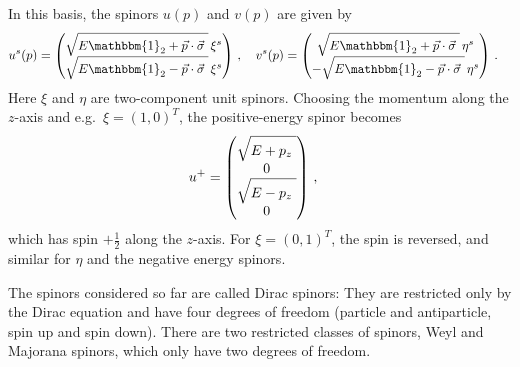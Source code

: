 \documentclass[12pt]{report}
\newcommand{\2}{\ensuremath{\sqrt{2}\,}}
\begin{document}
{      In this basis, the spinors $u\!\left(p\right)$ and $v\!\left(p\right)$ are given by 
      \begin{align}
        u^s\!\left(p\right) &= \begin{pmatrix}\sqrt{E \mathbbm{1}_2
            +\vec{p}\cdot\vec{\sigma}\rule[10pt]{3pt}{0pt}}\, \xi^s\\ 
          \sqrt{E \mathbbm{1}_2 -\vec{p}\cdot\vec{\sigma}\rule[10pt]{3pt}{0pt}}\,\xi^s \end{pmatrix}
        \,,\quad v^s\!\left(p\right) 
        = \begin{pmatrix}\sqrt{E \mathbbm{1}_2 +\vec{p}\cdot\vec{\sigma}\rule[10pt]{3pt}{0pt}} \,\eta^s\\  -\sqrt{E
            \mathbbm{1}_2 -\vec{p}\cdot\vec{\sigma}\rule[10pt]{3pt}{0pt}}\,\eta^s \end{pmatrix}  \,.
      \end{align}
      Here $\xi$ and $\eta$ are two-component unit spinors. Choosing the momentum along the $z$-axis
      and e.g.\ $\xi=\left(1,0\right)^T$, the positive-energy spinor becomes
      \begin{align}
        u^+ &= \begin{pmatrix} \sqrt{E+p_z\rule[10pt]{3pt}{0pt}}\\0 \\
          \sqrt{E-p_z\rule[10pt]{3pt}{0pt}}\\0\end{pmatrix}\,, 
      \end{align}
      which has spin $+\frac{1}{2}$ along the $z$-axis. For $\xi=\left(0,1\right)^T$, the spin is
      reversed, and similar for $\eta$ and the negative energy spinors.

      The spinors considered so far are called Dirac spinors: They are restricted only by the Dirac
      equation and have four degrees of freedom (particle and antiparticle, spin up and spin
      down). There are two restricted classes of spinors, Weyl and Majorana spinors, which only have
      two degrees of freedom.

}
\end{document}
